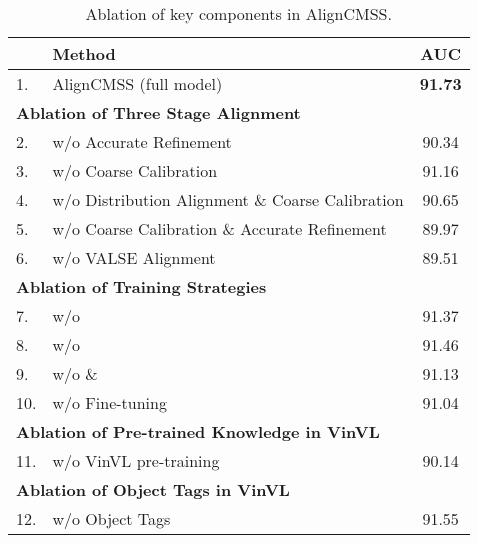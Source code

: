 \documentclass[letterpaper]{article} \usepackage{aaai24}  \usepackage{times}  \usepackage{helvet}  \usepackage{courier}  \usepackage[hyphens]{url}  \usepackage{graphicx} \urlstyle{rm} \def\UrlFont{\rm}  \usepackage{natbib}  \usepackage{caption} \frenchspacing  \setlength{\pdfpagewidth}{8.5in}  \setlength{\pdfpageheight}{11in}
\begin{document}
\begin{table}[t]
\centering
\scalebox{1.08}
{\scriptsize
\begin{tabular}{llc}
\toprule
         & \multicolumn{1}{l|}{\textbf{Method}}                & \textbf{AUC}   \\ \hline
1.       & \multicolumn{1}{l|}{AlignCMSS (full model)}                     & \textbf{91.73} \\ \hline
\multicolumn{2}{l|}{\textbf{Ablation of Three Stage Alignment}}         &                \\
2.       & \multicolumn{1}{l|}{w/o Accurate Refinement}          & 90.34          \\
3.       & \multicolumn{1}{l|}{w/o Coarse Calibration}       & 91.16          \\
4.       & \multicolumn{1}{l|}{w/o   Distribution Alignment \& Coarse Calibration}         & 90.65          \\
5.      & \multicolumn{1}{l|}{w/o    Coarse Calibration \& Accurate Refinement}        & 89.97          \\
6.      & \multicolumn{1}{l|}{w/o    VALSE Alignment}        & 89.51          \\
\multicolumn{2}{l|}{\textbf{Ablation of Training Strategies}} &                \\
7.       & \multicolumn{1}{l|}{w/o }                       &  91.37              \\
8.       & \multicolumn{1}{l|}{w/o }                        &  91.46              \\
9.       & \multicolumn{1}{l|}{w/o  \& }                      &     91.13           \\
10.       & \multicolumn{1}{l|}{w/o Fine-tuning}                      &      91.04          \\
\multicolumn{2}{l|}{\textbf{Ablation of Pre-trained Knowledge in VinVL}} &                \\
11.       & \multicolumn{1}{l|}{w/o VinVL pre-training}                       &    90.14         \\
\multicolumn{2}{l|}{\textbf{Ablation of Object Tags in VinVL}} &                \\
12.       & \multicolumn{1}{l|}{w/o Object Tags}                       &    91.55         \\
\bottomrule
\end{tabular}}
\caption{Ablation of key components in AlignCMSS.}
\vspace{-5pt}
\label{tab:ablation}
\end{table}
\end{document}
